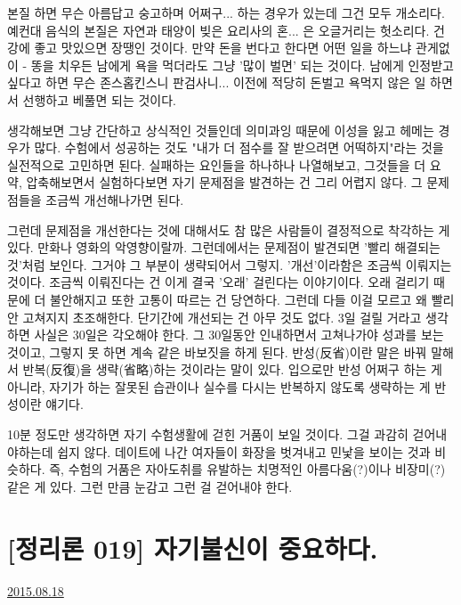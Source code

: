 본질 하면 무슨 아름답고 숭고하며 어쩌구... 하는 경우가 있는데 그건 모두 개소리다.
예컨대 음식의 본질은 자연과 태양이 빚은 요리사의 혼... 은 오글거리는 헛소리다. 건강에 좋고 맛있으면 장땡인 것이다.
만약 돈을 번다고 한다면 어떤 일을 하느냐 관게없이 - 똥을 치우든 남에게 욕을 먹더라도 그냥 '많이 벌면' 되는 것이다.
남에게 인정받고 싶다고 하면 무슨 존스홉킨스니 판검사니... 이전에 적당히 돈벌고 욕먹지 않은 일 하면서 선행하고 베풀면 되는 것이다.
\vspace{5mm}

생각해보면 그냥 간단하고 상식적인 것들인데 의미과잉 때문에 이성을 잃고 헤메는 경우가 많다.
수험에서 성공하는 것도 "내가 더 점수를 잘 받으려면 어떡하지"라는 것을 실전적으로 고민하면 된다.
실패하는 요인들을 하나하나 나열해보고, 그것들을 더 요약, 압축해보면서 실험하다보면 자기 문제점을 발견하는 건 그리 어렵지 않다.
그 문제점들을 조금씩 개선해나가면 된다.
\vspace{5mm}

그런데 문제점을 개선한다는 것에 대해서도 참 많은 사람들이 결정적으로 착각하는 게 있다.
만화나 영화의 악영향이랄까. 그런데에서는 문제점이 발견되면 '빨리 해결되는 것'처럼 보인다. 그거야 그 부분이 생략되어서 그렇지.
'개선'이라함은 조금씩 이뤄지는 것이다. 조금씩 이뤄진다는 건 이게 결국 '오래' 걸린다는 이야기이다.
오래 걸리기 때문에 더 불안해지고 또한 고통이 따르는 건 당연하다. 그런데 다들 이걸 모르고 왜 빨리 안 고쳐지지 초조해한다.
단기간에 개선되는 건 아무 것도 없다. 3일 걸릴 거라고 생각하면 사실은 30일은 각오해야 한다.
그 30일동안 인내하면서 고쳐나가야 성과를 보는 것이고, 그렇지 못 하면 계속 같은 바보짓을 하게 된다.
반성(反省)이란 말은 바꿔 말해서 반복(反復)을 생략(省略)하는 것이라는 말이 있다.
입으로만 반성 어쩌구 하는 게 아니라, 자기가 하는 잘못된 습관이나 실수를 다시는 반복하지 않도록 생략하는 게 반성이란 얘기다.
\vspace{5mm}

10분 정도만 생각하면 자기 수험생활에 걷힌 거품이 보일 것이다.
그걸 과감히 걷어내야하는데 쉽지 않다. 데이트에 나간 여자들이 화장을 벗겨내고 민낯을 보이는 것과 비슷하다.
즉, 수험의 거품은 자아도취를 유발하는 치명적인 아름다움(?)이나 비장미(?) 같은 게 있다.
그런 만큼 눈감고 그런 걸 걷어내야 한다.
\vspace{5mm}







\section{[정리론 019] 자기불신이 중요하다.}
\href{https://www.kockoc.com/Apoc/259767}{2015.08.18}

